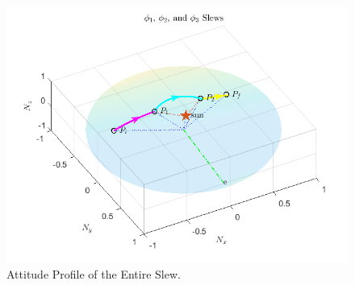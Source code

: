 \documentclass[letterpaper, preprint, paper,11pt]{AAS}	%
\begin{document}
		
			
			\begin{figure}[H]
				\begin{center}
					\includegraphics[width=4.75in]{figures/alphaNot0/phi1_phi2_phi3.png}
					\caption{Attitude Profile of the Entire Slew.}
					\label{fig:phi1_phi2_phi3}
				\end{center}		
			\end{figure}	
		
\end{document}

